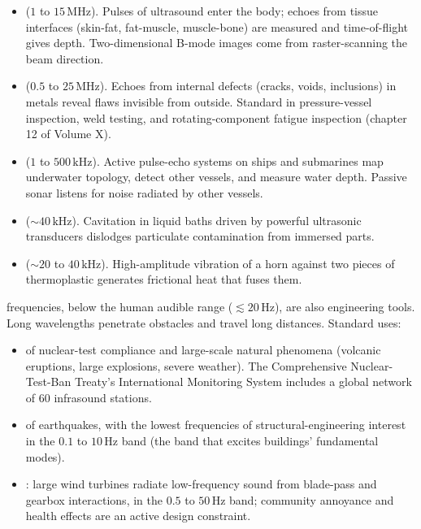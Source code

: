 \begin{itemize}[leftmargin=*]
  \item {} ($1$ to $15\,\si{\mega
    \hertz}$). Pulses of ultrasound enter the body; echoes from
    tissue interfaces (skin-fat, fat-muscle, muscle-bone) are
    measured and time-of-flight gives depth. Two-dimensional B-mode
    images come from raster-scanning the beam direction.
  \item {} ($0.5$ to
    $25\,\si{\mega\hertz}$). Echoes from internal defects (cracks,
    voids, inclusions) in metals reveal flaws invisible from
    outside. Standard in pressure-vessel inspection, weld testing,
    and rotating-component fatigue inspection (chapter 12 of Volume
    X).
  \item {} ($1$ to $500\,\si{\kilo\hertz}$). Active
    pulse-echo systems on ships and submarines map underwater
    topology, detect other vessels, and measure water depth. Passive
    sonar listens for noise radiated by other vessels.
  \item {} ($\sim 40\,\si{\kilo\hertz}$).
    Cavitation in liquid baths driven by powerful ultrasonic
    transducers dislodges particulate contamination from immersed
    parts.
  \item {} ($\sim 20$ to $40\,\si{\kilo
    \hertz}$). High-amplitude vibration of a horn against two
    pieces of thermoplastic generates frictional heat that fuses
    them.
\end{itemize}

 frequencies, below the human audible range
($\lesssim 20\,\si{\hertz}$), are also engineering tools. Long
wavelengths penetrate obstacles and travel long distances. Standard
uses:

\begin{itemize}[leftmargin=*]
  \item {} of nuclear-test compliance
    and large-scale natural phenomena (volcanic eruptions, large
    explosions, severe weather). The Comprehensive Nuclear-Test-Ban
    Treaty's International Monitoring System includes a global
    network of $60$ infrasound stations.
  \item {} of earthquakes, with the lowest
    frequencies of structural-engineering interest in the $0.1$ to
    $10\,\si{\hertz}$ band (the band that excites buildings'
    fundamental modes).
  \item {}: large wind turbines
    radiate low-frequency sound from blade-pass and gearbox
    interactions, in the $0.5$ to $50\,\si{\hertz}$ band; community
    annoyance and health effects are an active design constraint.
\end{itemize}

